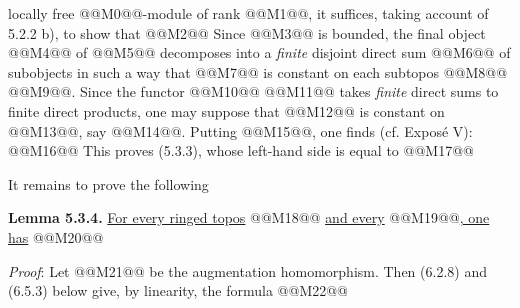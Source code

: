 
locally free @@M0@@-module of rank @@M1@@, it suffices, taking account of 5.2.2 b), to show that
@@M2@@
Since @@M3@@ is bounded, the final object @@M4@@ of @@M5@@ decomposes into a \emph{finite} disjoint direct sum @@M6@@ of subobjects in such a way that @@M7@@ is constant on each subtopos @@M8@@ @@M9@@. Since the functor @@M10@@ @@M11@@ takes \emph{finite} direct sums to finite direct products, one may suppose that @@M12@@ is constant on @@M13@@, say @@M14@@. Putting @@M15@@, one finds (cf. Exposé V):
@@M16@@
This proves (5.3.3), whose left-hand side is equal to
@@M17@@

It remains to prove the following

\textbf{Lemma 5.3.4.} \uline{For every ringed topos} @@M18@@ \uline{and every} @@M19@@\uline{, one has}
@@M20@@

\emph{Proof}: Let @@M21@@ be the augmentation homomorphism. Then (6.2.8) and (6.5.3) below give, by linearity, the formula
@@M22@@
